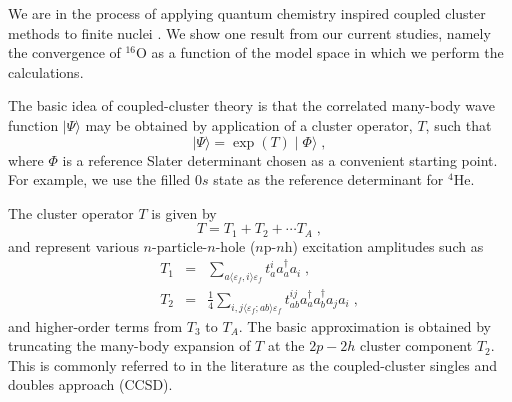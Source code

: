 \documentclass{ws-procs9x6}
\begin{document}
We are in the process of applying quantum chemistry inspired coupled cluster
methods
\cite{comp_chem_rev00,Bartlett95,Paldus99,Piecuch02a,Piecuch02b,cizek66,cizek69,Stanton:1993,Piecuch99,Kowalski00,Kowalski03} to
finite nuclei \cite{ref1,ref2}. We show one result
from our current studies, namely the convergence of $^{16}$O
as a function of the model space in which we perform the calculations.

The basic idea of coupled-cluster theory is that the correlated many-body
wave function $\mid \Psi\rangle$ 
may be obtained by application of a cluster operator, 
$T$, such that
\begin{equation}
\mid\Psi \rangle =\exp\left(T\right)\mid\Phi\rangle\;,
\end{equation}
where $\Phi$ is a reference Slater determinant chosen as a convenient starting
point.  For example, we use the filled $0s$ state as the reference 
determinant for $^4$He.

The cluster operator $T$ is given by
\begin{equation}
T=T_1 + T_2 + \cdots T_A\;,
\end{equation}
and represent various
$n$-particle-$n$-hole ($n$p-$n$h) excitation amplitudes such as
\begin{eqnarray}
T_1 &=& \sum_{a\langle\varepsilon_f, i\rangle\varepsilon_f}t^i_a a^\dagger_a a_i\;, \\
T_2 &=& \frac{1}{4}\sum_{i,j\langle\varepsilon_f; ab \rangle \varepsilon_f}t^{ij}_{ab}
a^\dagger_a a^\dagger_b a_j a_i\;,
\end{eqnarray}
and higher-order terms from $T_3$ to $T_A$.  
The basic approximation is obtained by truncating the many-body
expansion of $T$ at the $2p-2h$ cluster component $T_{2}$.
This is 
commonly referred to in the literature as the coupled-cluster singles and
doubles approach (CCSD). 
\end{document}
